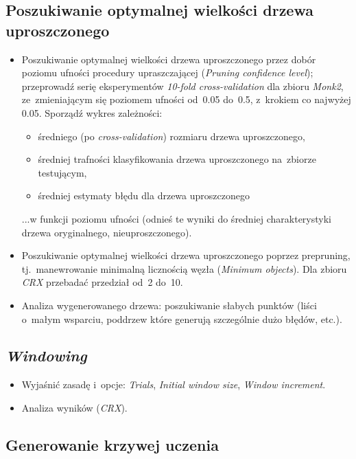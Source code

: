 \documentclass{article}
\begin{document}
\subsection{Poszukiwanie optymalnej wielkości drzewa uproszczonego}

\begin{itemize}
\item Poszukiwanie optymalnej wielkości drzewa uproszczonego przez dobór poziomu ufności procedury upraszczającej (\emph{Pruning confidence level}); przeprowadź serię eksperymentów \emph{10-fold cross-validation} dla zbioru \emph{Monk2}, ze~zmieniającym się poziomem ufności od~0.05 do~0.5, z~krokiem co najwyżej 0.05. Sporządź wykres zależności:

\begin{itemize}
\item średniego (po \emph{cross-validation}) rozmiaru drzewa uproszczonego,
\item średniej trafności klasyfikowania drzewa uproszczonego na~zbiorze testującym,
\item średniej estymaty błędu dla drzewa uproszczonego
\end{itemize}

...w funkcji poziomu ufności (odnieś te wyniki do średniej charakterystyki drzewa oryginalnego, nieuproszczonego).

\item Poszukiwanie optymalnej wielkości drzewa uproszczonego poprzez prepruning, tj.~manewrowanie minimalną licznością węzła (\emph{Minimum objects}). Dla zbioru \emph{CRX} przebadać przedział od~2 do~10.
\item Analiza wygenerowanego drzewa: poszukiwanie słabych punktów (liści o~małym wsparciu, poddrzew które generują szczególnie dużo błędów, etc.).
\end{itemize}

\subsection{\emph{Windowing}}

\begin{itemize}
\item Wyjaśnić zasadę i~opcje: \emph{Trials}, \emph{Initial window size}, \emph{Window increment}.
\item Analiza wyników (\emph{CRX}).
\end{itemize}

\subsection{Generowanie krzywej uczenia}
\end{document}
